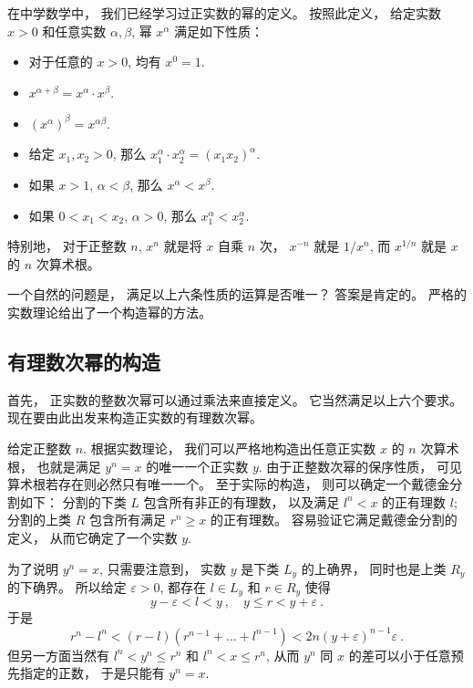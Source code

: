 

在中学数学中， 我们已经学习过正实数的幂的定义。 按照此定义， 给定实数$x>0$ 和任意实数 $\alpha,\beta$, 幂 $x^\alpha$ 满足如下性质：

\begin{itemize}
\item 对于任意的 $x>0$, 均有 $x^0=1$.
\item $x^{\alpha+\beta}=x^\alpha\cdot x^\beta$.
\item $(x^\alpha)^\beta=x^{\alpha\beta}$.
\item 给定 $x_1,x_2>0$, 那么 $x_1^\alpha\cdot x_2^\alpha=(x_1x_2)^\alpha$.
\item 如果 $x>1$, $\alpha<\beta$, 那么 $x^\alpha<x^\beta$.
\item 如果 $0<x_1<x_2$, $\alpha>0$, 那么 $x_1^\alpha<x_2^\alpha$.
\end{itemize}

特别地， 对于正整数 $n$, $x^n$ 就是将 $x$ 自乘 $n$ 次， $x^{-n}$ 就是 $1/x^n$, 而 $x^{1/n}$ 就是 $x$ 的 $n$ 次算术根。 

一个自然的问题是， 满足以上六条性质的运算是否唯一？ 答案是肯定的。 严格的实数理论给出了一个构造幂的方法。

\subsection{有理数次幂的构造}

首先， 正实数的整数次幂可以通过乘法来直接定义。 它当然满足以上六个要求。 现在要由此出发来构造正实数的有理数次幂。

给定正整数 $n$. 根据实数理论， 我们可以严格地构造出任意正实数 $x$ 的 $n$ 次算术根， 也就是满足 $y^n=x$ 的唯一一个正实数 $y$. 由于正整数次幂的保序性质， 可见算术根若存在则必然只有唯一一个。 至于实际的构造， 则可以确定一个戴德金分割如下： 分割的下类 $L$ 包含所有非正的有理数， 以及满足 $l^n<x$ 的正有理数 $l$; 分割的上类 $R$ 包含所有满足 $r^n\geq x$ 的正有理数。 容易验证它满足戴德金分割的定义， 从而它确定了一个实数 $y$. 

为了说明 $y^n=x$, 只需要注意到， 实数 $y$ 是下类 $L_y$ 的上确界， 同时也是上类 $R_y$ 的下确界。 所以给定 $\varepsilon>0$, 都存在 $l\in L_y$ 和 $r\in R_y$ 使得
\[
y-\varepsilon<l<y~,\quad y\leq r<y+\varepsilon~.
\]
于是
\[ 
r^n-l^n<(r-l)(r^{n-1}+...+l^{n-1})
<2n(y+\varepsilon)^{n-1}\varepsilon~.
\]
但另一方面当然有 $l^n<y^n\leq r^n$ 和 $l^n<x\leq r^n$, 从而 $y^n$ 同 $x$ 的差可以小于任意预先指定的正数， 于是只能有 $y^n=x$.

